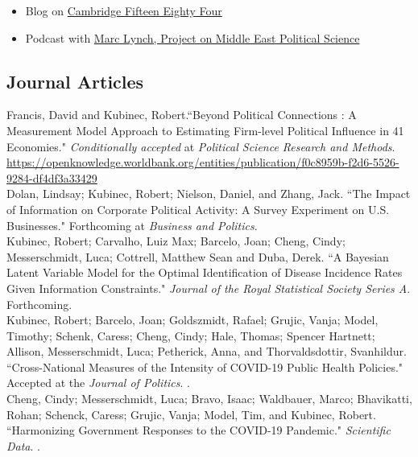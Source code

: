 \documentclass[11pt, a4paper]{article}
\newcommand{\years}[1]{\marginnote{\scriptsize #1}}
\begin{document}
\begin{itemize}
	\item Blog on \href{https://www.cambridgeblog.org/2023/07/arabs-want-democracy-but-not-with-corruption/}{Cambridge Fifteen Eighty Four}
	\item Podcast with \href{https://pomeps.org/making-democracy-safe-for-business-apsa-virtual-posters-s-13-ep-1}{Marc Lynch, Project on Middle East Political Science}
\end{itemize}

 \newpage
 
\subsection*{Journal Articles}

\years{2025}  Francis, David and Kubinec, Robert.``Beyond Political Connections : A Measurement Model Approach to Estimating Firm-level Political Influence in 41 Economies." \emph{Conditionally accepted} at \emph{Political Science Research and Methods}. \url{https://openknowledge.worldbank.org/entities/publication/f0c8959b-f2d6-5526-9284-df4df3a33429}\\

\years{2025} Dolan, Lindsay; Kubinec, Robert; Nielson, Daniel, and Zhang, Jack. ``The Impact of Information on Corporate Political Activity: A Survey Experiment on U.S. Businesses." Forthcoming at \emph{Business and Politics}. \\

\years{2024} Kubinec, Robert; Carvalho, Luiz Max; Barcelo, Joan; Cheng, Cindy; Messerschmidt, Luca; Cottrell, Matthew Sean and Duba, Derek. ``A Bayesian Latent Variable Model for the Optimal Identification of Disease Incidence Rates Given Information Constraints." \emph{Journal of the Royal Statistical Society Series A}. Forthcoming. \\

\years{2024} Kubinec, Robert; Barcelo, Joan; Goldszmidt, Rafael; Grujic, Vanja; Model, Timothy; Schenk, Caress; Cheng, Cindy; Hale, Thomas; Spencer Hartnett; Allison, Messerschmidt, Luca; Petherick, Anna, and Thorvaldsdottir, Svanhildur. ``Cross-National Measures of the Intensity of COVID-19 Public Health Policies." Accepted at the \emph{Journal of Politics}. .\\

\years{2024} Cheng, Cindy; Messerschmidt, Luca; Bravo, Isaac; Waldbauer, Marco; Bhavikatti, Rohan; Schenck, Caress; Grujic, Vanja; Model, Tim, and Kubinec, Robert. ``Harmonizing Government Responses to the COVID-19 Pandemic." \emph{Scientific Data}. .\\
\end{document}

